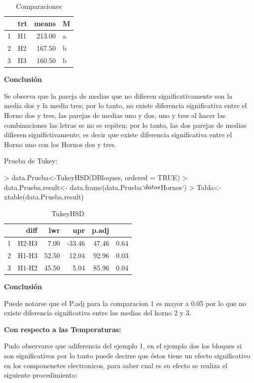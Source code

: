 \documentclass[12pt,letterpaper]{report}
\begin{document}
\begin{table}[ht]
\centering
\begin{tabular}{rlrl}
  \hline
 & trt & means & M \\ 
  \hline
1 & H1 & 213.00 & a \\ 
  2 & H2 & 167.50 & b \\ 
  3 & H3 & 160.50 & b \\ 
   \hline
\end{tabular}
\caption{Comparaciones}
\end{table}

\textbf{Conclusión}

Se observa que la pareja de medias que no difieren significativamente son la media dos
y la media tres; por lo tanto, no existe diferencia significativa entre el Horno dos y tres, las parejas de medias uno y dos, uno y tres al hacer las combinaciones las letras se no se repiten; por lo tanto, las dos
parejas de medias difieren significtivamente; es decir que existe diferencia significativa
entre el Horno uno con los Hornos dos y tres.

Prueba de Tukey:
\begin{Schunk}
\begin{Sinput}
> data.Prueba<-TukeyHSD(DBloques, ordered = TRUE)
> data.Prueba.result<- data.frame(data.Prueba$`datos$Hornos`)
> Tabla<- xtable(data.Prueba.result)
\end{Sinput}
\end{Schunk}

\begin{table}[ht]
\centering
\begin{tabular}{rrrrrr}
  \hline
 & diff & lwr & upr & p.adj \\ 
  \hline
  1&H2-H3 & 7.00 & -33.46 & 47.46 & 0.64 \\ 
  2&H1-H3 & 52.50 & 12.04 & 92.96 & 0.03 \\ 
  3&H1-H2 & 45.50 & 5.04 & 85.96 & 0.04 \\ 
   \hline
\end{tabular}
\caption{TukeyHSD}
\end{table}
\newpage
\textbf{Conclusión}

Puede notarse que el P.adj para la comparacion 1 es mayor a 0.05 por lo que no existe diferencia significativa entre las medias del horno 2 y 3.

\textbf{Con respecto a las Temperaturas:}

Pudo observarse que adiferencia del ejemplo 1, en el ejemplo dos los bloques si son significativos por lo tanto puede decirse que éstos tiene un efecto significativo en los componenetes electronicos, para saber cual es su efecto se realiza el siguiente procedimiento:
\end{document}
